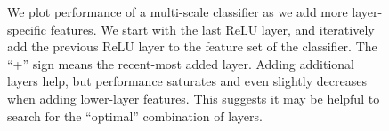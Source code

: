 \documentclass[10pt,twocolumn,letterpaper]{article}
\begin{document}

\begin{figure}[htbp]
\centering
\caption{We plot performance of a multi-scale classifier as we add more layer-specific features. We start with the last ReLU layer, and iteratively add the previous ReLU layer to the feature set of the classifier.
The ``+'' sign means the recent-most added layer. Adding additional layers help, but performance saturates and even slightly decreases when adding lower-layer features. This suggests it may be helpful to search for the ``optimal'' combination of layers.}
\label{fig:add_back}
\end{figure}
\end{document}
